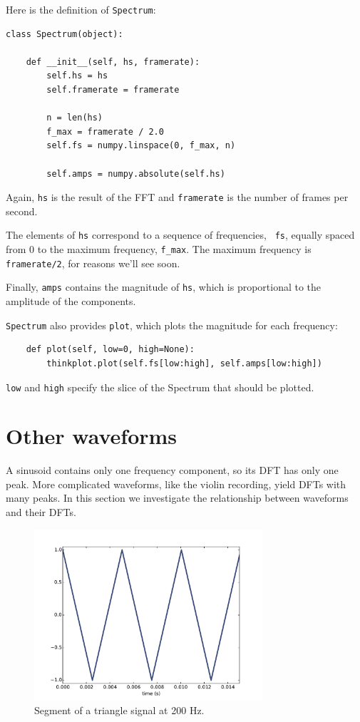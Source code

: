 \documentclass[12pt]{book}
\begin{document}
Here is the definition of {\tt Spectrum}:

\begin{verbatim}
class Spectrum(object):

    def __init__(self, hs, framerate):
        self.hs = hs
        self.framerate = framerate

        n = len(hs)
        f_max = framerate / 2.0
        self.fs = numpy.linspace(0, f_max, n)

        self.amps = numpy.absolute(self.hs)
\end{verbatim}

Again, {\tt hs} is the result of the FFT and {\tt framerate}
is the number of frames per second.

The elements of {\tt hs} correspond to a sequence of frequencies, {\tt
  fs}, equally spaced from 0 to the maximum frequency, \verb"f_max".
The maximum frequency is {\tt framerate/2}, for reasons we'll see
soon.

Finally, {\tt amps} contains the magnitude of {\tt hs}, which
is proportional to the amplitude of the components.

{\tt Spectrum} also provides {\tt plot}, which plots the magnitude for
each frequency:

\begin{verbatim}
    def plot(self, low=0, high=None):
        thinkplot.plot(self.fs[low:high], self.amps[low:high])
\end{verbatim}

{\tt low} and {\tt high} specify the slice of the Spectrum that
should be plotted.


\section{Other waveforms}

A sinusoid contains only one frequency component, so its DFT
has only one peak.  More complicated waveforms, like the
violin recording, yield DFTs with many peaks.  In this section we
investigate the relationship between waveforms and their DFTs.

\begin{figure}
\centerline{\includegraphics[height=2.5in]{figs/triangle-200-1.pdf}}
\caption{Segment of a triangle signal at 200 Hz.}
\label{fig.triangle.200.1}
\end{figure}
\end{document}
